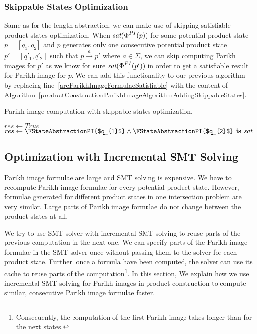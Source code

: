 \subsubsection{Skippable States Optimization}

Same as for the length abstraction, we can make use of skipping satisfiable product states optimization. When $\emph{sat}(\emph{$\Phi$}^{PI}(p))$ for some potential product state $p = [q_1, q_2]$ and $p$ generates only one consecutive potential product state $p' = [q'_1, q'_2]$ such that $p \xrightarrow{a} p'$ where $ a \in \Sigma $, we can skip computing Parikh images for $p'$ as we know for sure $\emph{sat}(\emph{$\Phi$}^{PI}(p'))$ in order to get a satisfiable result for Parikh image for $p$. We can add this functionality to our previous algorithm by replacing line~\ref{areParikhImageFormulaeSatisfiable} with the content of Algorithm~\ref{productConstructionParikhImageAlgorithmAddingSkippableStates}.

\begin{algorithm}
\caption{Parikh image computation with skippable states optimization.}\label{productConstructionParikhImageAlgorithmAddingSkippableStates}
\DontPrintSemicolon
\BlankLine
    \eIf{$\FIsSkippable{$[q_1, q_2]$}$} {
        $res \gets True$ \;
    } { %
        $res \gets \FStateAbstractionPI{$q_{1}$} \land \FStateAbstractionPI{$q_{2}$} \textbf{ is } \emph{sat} $ \;
    }
\end{algorithm}

\subsection{Optimization with Incremental SMT Solving}

Parikh image formulae are large and SMT solving is expensive. We have to recompute Parikh image formulae for every potential product state. However, formulae generated for different product states in one intersection problem are very similar. Large parts of Parikh image formulae do not change between the product states at all.

We try to use SMT solver with incremental SMT solving to reuse parts of the previous computation in the next one. We can specify parts of the Parikh image formulae in the SMT solver once without passing them to the solver for each product state. Further, once a formula have been computed, the solver can use its cache to reuse parts of the computation\footnote{Consequently, the computation of the first Parikh image takes longer than for the next states.}. In this section, We explain how we use incremental SMT solving for Parikh images in product construction to compute similar, consecutive Parikh image formulae faster.

